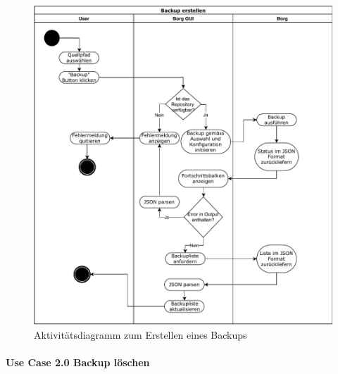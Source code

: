 \begin{figure}[htbp]
\centering
\includegraphics[width=.9\linewidth]{pictures/activity_backup.pdf}
\caption{\label{fig:orgf32c20d}
Aktivitätsdiagramm zum Erstellen eines Backups}
\end{figure}
\newpage
\paragraph{Use Case 2.0 Backup löschen}
\label{sec:org2792bbb}

